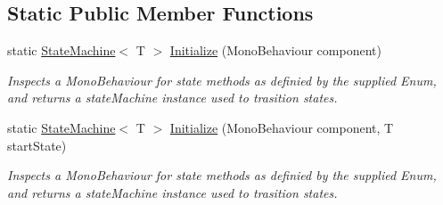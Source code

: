 \subsection*{Static Public Member Functions}
\begin{DoxyCompactItemize}
\item 
static \hyperlink{class_monster_love_1_1_state_machine_1_1_state_machine}{State\+Machine}$<$ T $>$ \hyperlink{class_monster_love_1_1_state_machine_1_1_state_machine_aa5d979a87e17102286c25da522ea7740}{Initialize} (Mono\+Behaviour component)
\begin{DoxyCompactList}\small\item\em Inspects a Mono\+Behaviour for state methods as definied by the supplied Enum, and returns a state\+Machine instance used to trasition states. \end{DoxyCompactList}\item 
static \hyperlink{class_monster_love_1_1_state_machine_1_1_state_machine}{State\+Machine}$<$ T $>$ \hyperlink{class_monster_love_1_1_state_machine_1_1_state_machine_a238623b813feb3922c0c72a0b299dbd3}{Initialize} (Mono\+Behaviour component, T start\+State)
\begin{DoxyCompactList}\small\item\em Inspects a Mono\+Behaviour for state methods as definied by the supplied Enum, and returns a state\+Machine instance used to trasition states. \end{DoxyCompactList}\end{DoxyCompactItemize}
